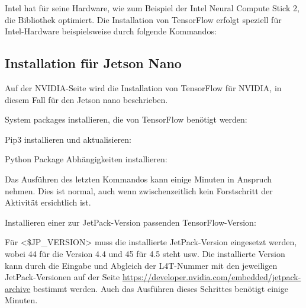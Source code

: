Intel hat für seine Hardware, wie zum Beispiel der Intel Neural Compute Stick 2, die Bibliothek 
optimiert. Die Installation von TensorFlow erfolgt speziell 
für Intel-Hardware beispielsweise durch folgende Kommandos:

\medskip



\medskip


\subsection{Installation für Jetson Nano}
Auf der NVIDIA-Seite wird die Installation von TensorFlow für NVIDIA, in diesem Fall für den Jetson nano beschrieben.\cite{NVIDIA.27.10.2020}

System packages installieren, die von TensorFlow benötigt werden:

\medskip

Pip3 installieren und aktualisieren:

\medskip

Python Package Abhängigkeiten installieren:


\medskip

Das Ausführen des letzten Kommandos kann einige Minuten in Anspruch nehmen. Dies ist normal, auch wenn zwischenzeitlich
kein Forstschritt der Aktivität ersichtlich ist.

\medskip

Installieren einer zur JetPack-Version passenden TensorFlow-Version:
\medskip

Für <\$JP\_VERSION> muss die installierte JetPack-Version eingesetzt werden, wobei 44 für die Version 4.4 und 45 für 4.5 steht usw.
Die installierte Version kann durch die Eingabe
und Abgleich der L4T-Nummer mit den jeweiligen JetPack-Versionen auf der Seite \url{https://developer.nvidia.com/embedded/jetpack-archive}
bestimmt werden.
Auch das Ausführen dieses Schrittes benötigt einige Minuten.


